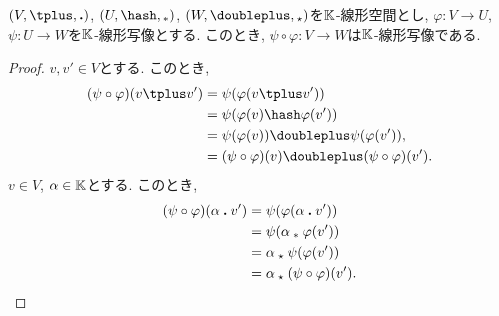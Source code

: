 \begin{example}
  $(V,\plus,\act)$, $(U,\pplus,\aact)$, $(W,\Plus,\Act)$を$\mathbb{K}$-線形空間とし,
  $\varphi\colon V\to U$,
  $\psi\colon U\to W$を$\mathbb{K}$-線形写像とする.
  このとき, $\psi\circ\varphi\colon V\to W$は$\mathbb{K}$-線形写像である.
\end{example}
\begin{proof}
$v,v'\in V$とする.
このとき,
\begin{align*}
(\psi\circ\varphi)(v\plus v')
&=\psi(\varphi(v\plus v'))\\
&=\psi(\varphi(v)\pplus \varphi(v'))\\
&=\psi(\varphi(v))\Plus \psi(\varphi(v')),\\
&=(\psi\circ\varphi)(v)\Plus (\psi\circ\varphi)(v').
\end{align*}
$v\in V$, $\alpha\in\mathbb{K}$とする.
このとき,
\begin{align*}
(\psi\circ\varphi)(\alpha\mathbin{\boldsymbol{.}} v')
&=\psi(\varphi(\alpha\mathbin{\boldsymbol{.}} v'))\\
&=\psi(\alpha\mathbin{{}_\ast} \varphi(v'))\\
&=\alpha\mathbin{{}_\star} \psi(\varphi(v'))\\
&=\alpha\mathbin{{}_\star} (\psi\circ\varphi)(v').
\end{align*}
\end{proof}

